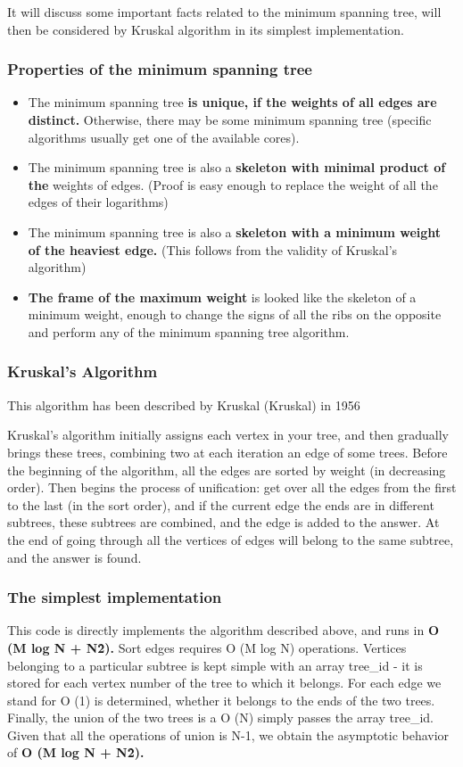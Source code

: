 It will discuss some important facts related to the minimum spanning tree, will then be considered by Kruskal algorithm in its simplest implementation.

\subsubsection{ Properties of the minimum spanning tree } \begin{itemize} \item The minimum spanning tree \textbf{is unique, if the weights of all edges are distinct.} Otherwise, there may be some minimum spanning tree (specific algorithms usually get one of the available cores). \item The minimum spanning tree is also a \textbf{skeleton with minimal product of the} weights of edges. 
(Proof is easy enough to replace the weight of all the edges of their logarithms) \item The minimum spanning tree is also a \textbf{skeleton with a minimum weight of the heaviest edge.} 
(This follows from the validity of Kruskal's algorithm) \item \textbf{The frame of the maximum weight} is looked like the skeleton of a minimum weight, enough to change the signs of all the ribs on the opposite and perform any of the minimum spanning tree algorithm. \end{itemize}

\subsubsection{ Kruskal's Algorithm }
This algorithm has been described by Kruskal (Kruskal) in 1956

Kruskal's algorithm initially assigns each vertex in your tree, and then gradually brings these trees, combining two at each iteration an edge of some trees. Before the beginning of the algorithm, all the edges are sorted by weight (in decreasing order). Then begins the process of unification: get over all the edges from the first to the last (in the sort order), and if the current edge the ends are in different subtrees, these subtrees are combined, and the edge is added to the answer. At the end of going through all the vertices of edges will belong to the same subtree, and the answer is found.

\subsubsection{ The simplest implementation }
This code is directly implements the algorithm described above, and runs in \textbf{O (M log N + N\^2).} Sort edges requires O (M log N) operations. Vertices belonging to a particular subtree is kept simple with an array tree\_id - it is stored for each vertex number of the tree to which it belongs. For each edge we stand for O (1) is determined, whether it belongs to the ends of the two trees. Finally, the union of the two trees is a O (N) simply passes the array tree\_id. Given that all the operations of union is N-1, we obtain the asymptotic behavior of \textbf{O (M log N + N\^2).}

